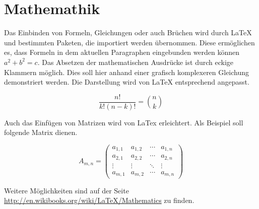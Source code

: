 \section{Mathemathik}

Das Einbinden von Formeln, Gleichungen oder auch Brüchen wird durch LaTeX und bestimmten Paketen, die importiert werden übernommen.
Diese ermöglichen es, dass Formeln in dem aktuellen Paragraphen eingebunden werden können \(a^2 + b^2 = c \).
Das Absetzen der mathematischen Ausdrücke ist durch eckige Klammern möglich. Dies soll hier anhand einer grafisch komplexeren Gleichung demonstriert werden.
Die Darstellung wird von LaTeX entsprechend angepasst.

\[
 \frac{n!}{k!(n-k)!} = \binom{n}{k}
\]

\noindent Auch das Einfügen von Matrizen wird von LaTex erleichtert.
Als Beispiel soll folgende Matrix dienen.

\[
 A_{m,n} =
 \begin{pmatrix}
    a_{1,1} & a_{1,2} & \cdots & a_{1,n} \\
    a_{2,1} & a_{2,2} & \cdots & a_{2,n} \\
    \vdots  & \vdots  & \ddots & \vdots  \\
    a_{m,1} & a_{m,2} & \cdots & a_{m,n}
 \end{pmatrix}
\]

\noindent Weitere Möglichkeiten sind auf der Seite \url{http://en.wikibooks.org/wiki/LaTeX/Mathematics} zu finden.